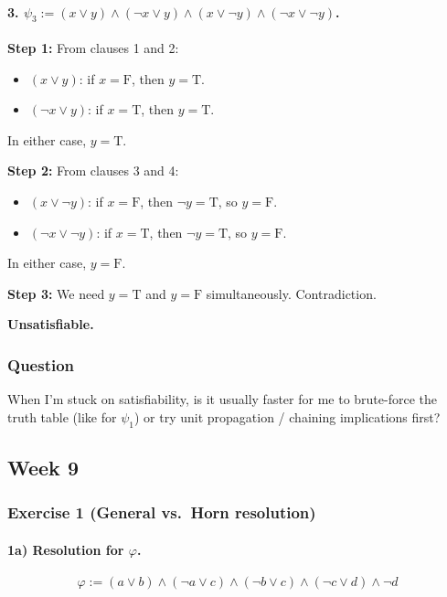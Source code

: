 \documentclass{article}
\theoremstyle{theorem}
\theoremstyle{definition}
\theoremstyle{remark}
\begin{document}
\paragraph{3. $\psi_3 := (x \lor y) \land (\neg x \lor y) \land (x \lor \neg y) \land (\neg x \lor \neg y)$.}

\textbf{Step 1:} From clauses 1 and 2:
\begin{itemize}
    \item $(x \lor y)$: if $x = \text{F}$, then $y = \text{T}$.
    \item $(\neg x \lor y)$: if $x = \text{T}$, then $y = \text{T}$.
\end{itemize}
In either case, $y = \text{T}$.

\textbf{Step 2:} From clauses 3 and 4:
\begin{itemize}
    \item $(x \lor \neg y)$: if $x = \text{F}$, then $\neg y = \text{T}$, so $y = \text{F}$.
    \item $(\neg x \lor \neg y)$: if $x = \text{T}$, then $\neg y = \text{T}$, so $y = \text{F}$.
\end{itemize}
In either case, $y = \text{F}$.

\textbf{Step 3:} We need $y = \text{T}$ and $y = \text{F}$ simultaneously. Contradiction.

\textbf{Unsatisfiable.}

\subsubsection*{Question}
When I'm stuck on satisfiability, is it usually faster for me to brute-force the truth table (like for $\psi_1$) or try unit propagation / chaining implications first?

\subsection{Week 9}\label{sec:week9}

\subsubsection*{Exercise 1 (General vs.\ Horn resolution)}

\paragraph{1a) Resolution for $ \varphi $.}
\[
\varphi :=(a \lor b)\land(\neg a \lor c)\land(\neg b \lor c)\land(\neg c \lor d)\land \neg d
\]
\end{document}
